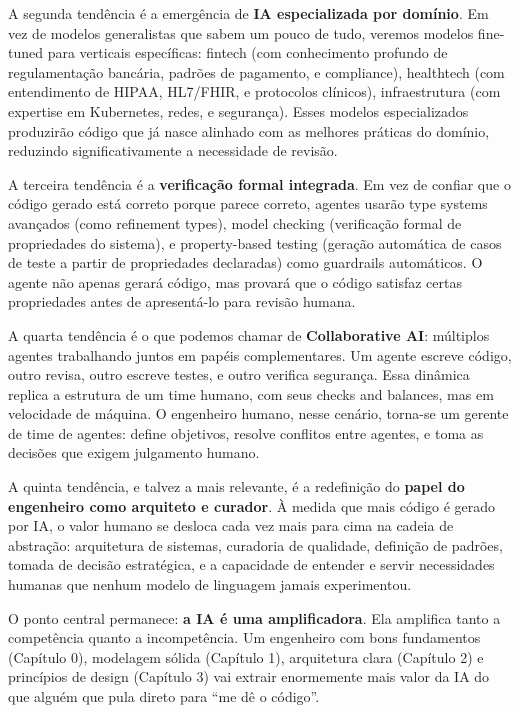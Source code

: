A segunda tendência é a emergência de \textbf{IA especializada por domínio}. Em vez de
modelos generalistas que sabem um pouco de tudo, veremos modelos fine-tuned para
verticais específicas: fintech (com conhecimento profundo de regulamentação bancária,
padrões de pagamento, e compliance), healthtech (com entendimento de HIPAA, HL7/FHIR,
e protocolos clínicos), infraestrutura (com expertise em Kubernetes, redes, e
segurança). Esses modelos especializados produzirão código que já nasce alinhado com
as melhores práticas do domínio, reduzindo significativamente a necessidade de revisão.

A terceira tendência é a \textbf{verificação formal integrada}. Em vez de confiar que
o código gerado está correto porque parece correto, agentes usarão type systems
avançados (como refinement types), model checking (verificação formal de propriedades
do sistema), e property-based testing (geração automática de casos de teste a partir
de propriedades declaradas) como guardrails automáticos. O agente não apenas gerará
código, mas provará que o código satisfaz certas propriedades antes de apresentá-lo
para revisão humana.

A quarta tendência é o que podemos chamar de \textbf{Collaborative AI}: múltiplos
agentes trabalhando juntos em papéis complementares. Um agente escreve código, outro
revisa, outro escreve testes, e outro verifica segurança. Essa dinâmica replica a
estrutura de um time humano, com seus checks and balances, mas em velocidade de
máquina. O engenheiro humano, nesse cenário, torna-se um gerente de time de agentes:
define objetivos, resolve conflitos entre agentes, e toma as decisões que exigem
julgamento humano.

A quinta tendência, e talvez a mais relevante, é a redefinição do \textbf{papel do
engenheiro como arquiteto e curador}. À medida que mais código é gerado por IA, o
valor humano se desloca cada vez mais para cima na cadeia de abstração: arquitetura
de sistemas, curadoria de qualidade, definição de padrões, tomada de decisão
estratégica, e a capacidade de entender e servir necessidades humanas que nenhum
modelo de linguagem jamais experimentou.

O ponto central permanece: \textbf{a IA é uma amplificadora}. Ela amplifica
tanto a competência quanto a incompetência. Um engenheiro com bons
fundamentos (Capítulo 0), modelagem sólida (Capítulo 1), arquitetura clara
(Capítulo 2) e princípios de design (Capítulo 3) vai extrair enormemente
mais valor da IA do que alguém que pula direto para ``me dê o código''.

